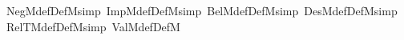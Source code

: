\begin{isabellebody}
\ \ NegM{\isacharunderscore}{\kern0pt}def{\isacharbrackleft}{\kern0pt}DefM{\isacharcomma}{\kern0pt}simp{\isacharbrackright}{\kern0pt}\ ImpM{\isacharunderscore}{\kern0pt}def{\isacharbrackleft}{\kern0pt}DefM{\isacharcomma}{\kern0pt}simp{\isacharbrackright}{\kern0pt}\ BelM{\isacharunderscore}{\kern0pt}def{\isacharbrackleft}{\kern0pt}DefM{\isacharcomma}{\kern0pt}simp{\isacharbrackright}{\kern0pt}\ DesM{\isacharunderscore}{\kern0pt}def{\isacharbrackleft}{\kern0pt}DefM{\isacharcomma}{\kern0pt}simp{\isacharbrackright}{\kern0pt}\isanewline
\ \ RelTM{\isacharunderscore}{\kern0pt}def{\isacharbrackleft}{\kern0pt}DefM{\isacharcomma}{\kern0pt}simp{\isacharbrackright}{\kern0pt}\ ValM{\isacharunderscore}{\kern0pt}def{\isacharbrackleft}{\kern0pt}DefM{\isacharbrackright}{\kern0pt}\isanewline
%
\isadelimtheory
\isanewline
%
\endisadelimtheory
%
\isatagtheory
{}\isamarkupfalse%
%
\endisatagtheory
{\isafoldtheory}%
%
\isadelimtheory
%
\endisadelimtheory
%
\end{isabellebody}%
\endinput
